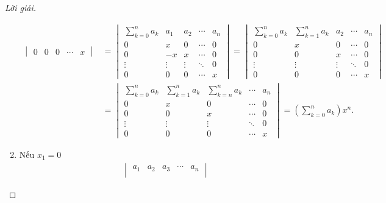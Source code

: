 \documentclass[class=linear-algebra,crop=false]{standalone}
\begin{document}
\begin{proof}[Lời giải]
\begin{enumerate}[label = (\alph*)]
\begin{align*}
\begin{vmatrix}
				      0      & 0      & 0      & \cdots & x
			      \end{vmatrix}
			       & =
			      \begin{vmatrix}
				      \sum^{n}_{k=0}a_{k} & a_{1}  & a_{2}  & \cdots & a_{n} \\
				      0                   & x      & 0      & \cdots & 0     \\
				      0                   & -x     & x      & \cdots & 0     \\
				      \vdots              & \vdots & \vdots & \ddots & 0     \\
				      0                   & 0      & 0      & \cdots & x
			      \end{vmatrix}
			      =
			      \begin{vmatrix}
				      \sum^{n}_{k=0}a_{k} & \sum^{n}_{k=1}a_{k} & a_{2}  & \cdots & a_{n} \\
				      0                   & x                   & 0      & \cdots & 0     \\
				      0                   & 0                   & x      & \cdots & 0     \\
				      \vdots              & \vdots              & \vdots & \ddots & 0     \\
				      0                   & 0                   & 0      & \cdots & x
			      \end{vmatrix} \\
			       & =
			      \begin{vmatrix}
				      \sum^{n}_{k=0}a_{k} & \sum^{n}_{k=1}a_{k} & \sum^{n}_{k=n}a_{k} & \cdots & a_{n} \\
				      0                   & x                   & 0                   & \cdots & 0     \\
				      0                   & 0                   & x                   & \cdots & 0     \\
				      \vdots              & \vdots              & \vdots              & \ddots & 0     \\
				      0                   & 0                   & 0                   & \cdots & x
			      \end{vmatrix}
			      = \left(\sum^{n}_{k=0}a_{k}\right)x^{n}.
		      \end{align*}
		      \endgroup{}
		\item Nếu $x_{1} = 0$
		      \begin{align*}
			      \begin{vmatrix}
				      a_{1}  & a_{2}  & a_{3}  & \cdots & a_{n}  \\

\end{vmatrix}
\end{align*}
\end{enumerate}
\end{proof}
\end{document}
